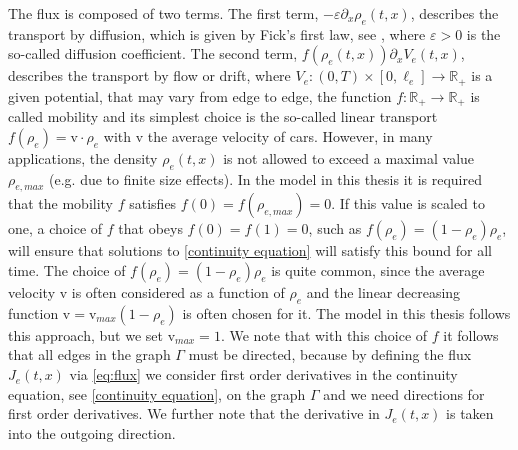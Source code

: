 The flux is composed of two terms. The first term, $- \varepsilon \partial_x \rho_e (t, x)$, describes the transport by diffusion, which is given by Fick's first law, see \cite{Fick:1855}, where $\varepsilon > 0$ is the so-called diffusion coefficient. The second term, $f(\rho_e(t, x)) \partial_x V_e(t, x)$, describes the transport by flow or drift, where $V_e \colon (0,T) \times [0, \ell_e] \to \mathbb{R}_{+}$ is a given potential, that may vary from edge to edge, the function $f \colon \mathbb{R}_{+} \to \mathbb{R}_{+}$ is called mobility and its simplest choice is the so-called linear transport $f(\rho_e) = \mathrm{v} \cdot \rho_e$ with $\mathrm{v}$ the average velocity of cars. However, in many applications, the density $\rho_e (t,x)$ is not allowed to exceed a maximal value $\rho_{e, max}$ (e.g. due to finite size effects). In the model in this thesis it is required that the mobility $f$ satisfies $f(0) = f(\rho_{e, max}) = 0$. If this value is scaled to one, a choice of $f$ that obeys $f(0) = f(1) = 0$, such as $f(\rho_e) = (1-\rho_e) \rho_e$, will ensure that solutions to \eqref{continuity equation} will satisfy this bound for all time. The choice of $f(\rho_e) = (1-\rho_e) \rho_e$ is quite common, since the average velocity $\mathrm{v}$ is often considered as a function of $\rho_e$ and the linear decreasing function $\mathrm{v} = \mathrm{v}_{max} (1-\rho_e)$ is often chosen for it. The model in this thesis follows this approach, but we set $\mathrm{v}_{max} = 1$. We note that with this choice of $f$ it follows that all edges in the graph $\Gamma$ must be directed, because by defining the flux $J_e(t,x)$ via \cref{eq:flux} we consider first order derivatives in the continuity equation, see \cref{continuity equation}, on the graph $\Gamma$ and we need directions for first order derivatives. We further note that the derivative in $J_e(t,x)$ is taken into the outgoing direction. \\

